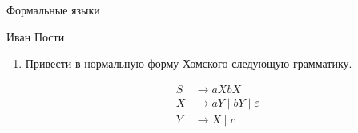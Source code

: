 \documentclass[12pt]{article}
\begin{document}
\begin{center}
{\LARGE Формальные языки}

\bigskip

{\Large Иван Пости}
\end{center} 

\bigskip

\begin{enumerate}
  \item Привести в нормальную форму Хомского следующую грамматику.

  \begin{align*}
      S &\to a X b X \\
      X &\to a Y \mid b Y \mid \varepsilon \\
      Y &\to X \mid c 
  \end{align*}
  
\end{enumerate}
\end{document}
